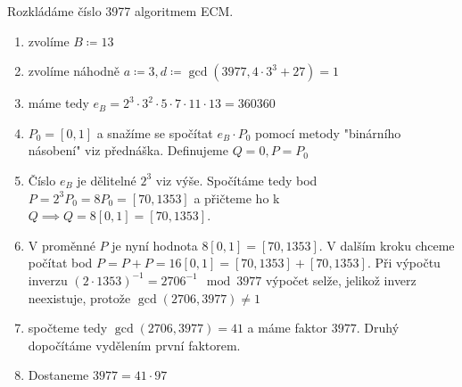 \documentclass[12pt, a4paper]{article}
\begin{document}
Rozkládáme číslo 3977 algoritmem ECM.
\begin{enumerate}
\item zvolíme $B \coloneqq 13$
\item zvolíme náhodně $a \coloneqq 3, d \coloneqq \gcd(3977, 4\cdot 3^3 + 27) = 1$
\item máme tedy $e_B = 2^3\cdot 3^2 \cdot 5 \cdot 7 \cdot 11 \cdot 13 = 360360$
\item $P_0 = [0,1]$ a snažíme se spočítat $e_B \cdot P_0$ pomocí metody "binárního násobení" viz přednáška. Definujeme $Q = 0, P = P_0$ 
\item Číslo $e_B$ je dělitelné $2^3$ viz výše. Spočítáme tedy bod $P = 2^3 P_0 = 8P_0 = [70, 1353]$ a přičteme ho k $Q \implies Q = 8[0,1] = [70, 1353]$.
\item V proměnné $P$ je nyní hodnota $8[0,1] = [70, 1353]$. V dalším kroku chceme počítat bod $P = P+P = 16[0,1] = [70, 1353] + [70, 1353]$. Při výpočtu inverzu $(2 \cdot 1353)^{-1} = 2706^{-1} \mod 3977$ výpočet selže, jelikož inverz neexistuje, protože $\gcd(2706,3977) \neq 1$
\item spočteme tedy $\gcd(2706,3977) = 41$ a máme faktor $3977$. Druhý dopočítáme vydělením první faktorem.
\item Dostaneme $3977 = 41\cdot 97$
\end{enumerate}
\end{document}
